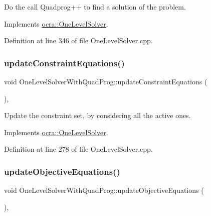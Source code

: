 Do the call Quadprog++ to find a solution of the problem. 

Implements \hyperlink{classocra_1_1OneLevelSolver_aeb4fb349df382921c5c0064d7a05c48b}{ocra\+::\+One\+Level\+Solver}.



Definition at line 346 of file One\+Level\+Solver.\+cpp.

\hypertarget{classocra_1_1OneLevelSolverWithQuadProg_a0276b1005f8b5812b313aa594d01118a}{}\label{classocra_1_1OneLevelSolverWithQuadProg_a0276b1005f8b5812b313aa594d01118a} 
\subsubsection{\texorpdfstring{update\+Constraint\+Equations()}{updateConstraintEquations()}}
{\footnotesize\ttfamily void One\+Level\+Solver\+With\+Quad\+Prog\+::update\+Constraint\+Equations (\begin{DoxyParamCaption}{ }\end{DoxyParamCaption})\hspace{0.3cm}{\ttfamily [protected]}, {\ttfamily [virtual]}}

Update the constraint set, by considering all the active ones. 

Implements \hyperlink{classocra_1_1OneLevelSolver_af592dc713af6cf22e67abcdfba09ca5e}{ocra\+::\+One\+Level\+Solver}.



Definition at line 278 of file One\+Level\+Solver.\+cpp.

\hypertarget{classocra_1_1OneLevelSolverWithQuadProg_a3c36b4620ee75c8f6c104244350087c2}{}\label{classocra_1_1OneLevelSolverWithQuadProg_a3c36b4620ee75c8f6c104244350087c2} 
\subsubsection{\texorpdfstring{update\+Objective\+Equations()}{updateObjectiveEquations()}}
{\footnotesize\ttfamily void One\+Level\+Solver\+With\+Quad\+Prog\+::update\+Objective\+Equations (\begin{DoxyParamCaption}{ }\end{DoxyParamCaption})\hspace{0.3cm}{\ttfamily [protected]}, {\ttfamily [virtual]}}

